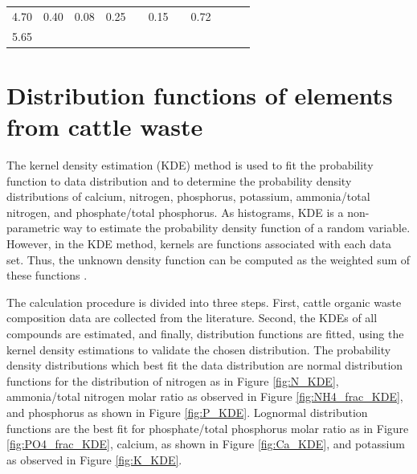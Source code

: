 \documentclass[10pt,a4paper]{article}
\begin{document}
\begin{table}
\begin{tabular}{@{}ccccccccccc@{}}
		4.70                                                         & 0.40                                                & 0.08                                                & 0.25                                                &                                                     & 0.15                                                 &                                                     & 0.72                                                  &                                                         &                                                      & \cite{Normak}                                                              \\
		5.65                                                         &                                                     &                                                     &                                                     &                                                     &                                                      &                                                     &                                                       &                                                         &                                                      & \cite{Xia}                                                                   \\ \bottomrule
	\end{tabular}
\end{table}

\newpage

\section{Distribution functions of elements from cattle waste}


The kernel density estimation (KDE) method is used to fit the probability function to data distribution and to determine the probability density distributions of calcium, nitrogen, phosphorus, potassium, ammonia/total nitrogen, and phosphate/total phosphorus. As histograms, KDE is a non-parametric way to estimate the probability density function of a random variable. However, in the KDE method, kernels are functions associated with each data set. Thus, the unknown density function can be computed as the weighted sum of these functions . 

The calculation procedure is divided into three steps. First, cattle organic waste composition data are collected from the literature. Second, the KDEs of all compounds are estimated, and finally, distribution functions are fitted, using the kernel density estimations to validate the chosen distribution. The probability density distributions which best fit the data distribution are normal distribution functions for the distribution of nitrogen as in Figure \ref{fig:N_KDE}, ammonia/total nitrogen molar ratio as observed in Figure \ref{fig:NH4_frac_KDE}, and phosphorus as shown in Figure \ref{fig:P_KDE}. Lognormal distribution functions are the best fit for phosphate/total phosphorus molar ratio as in Figure \ref{fig:PO4_frac_KDE}, calcium, as shown in Figure \ref{fig:Ca_KDE}, and potassium as observed in Figure \ref{fig:K_KDE}.
\end{document}
